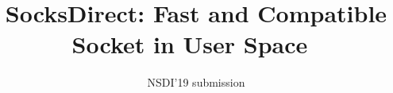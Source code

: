 \documentclass[twocolumn,10pt]{article}
\begin{document}
\pagestyle{plain} %

\date{}

\title{SocksDirect: Fast and Compatible Socket in User Space~\vspace{-0.1in}}

\author{{\rm NSDI'19 submission}\vspace{-0.5in}}

\maketitle

\newcommand{\specialcell}[2][c]{%
  \begin{tabular}[#1]{@{}c@{}}#2\end{tabular}}







%






\small 
\balance


\end{document}

